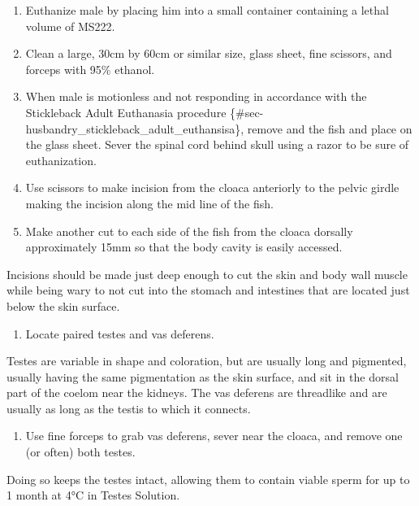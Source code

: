 \documentclass[
  letterpaper,
  DIV=11,
  numbers=noendperiod]{scrreprt}
\providecommand{\tightlist}{%
  \setlength{\itemsep}{0pt}\setlength{\parskip}{0pt}}\usepackage{longtable,booktabs,array}
\begin{document}
\begin{enumerate}
\def\labelenumi{\arabic{enumi}.}
\setcounter{enumi}{4}
\tightlist
\item
  Euthanize male by placing him into a small container containing a
  lethal volume of MS222.
\item
  Clean a large, 30cm by 60cm or similar size, glass sheet, fine
  scissors, and forceps with 95\% ethanol.
\item
  When male is motionless and not responding in accordance with the
  Stickleback Adult Euthanasia procedure
  \{\#sec-husbandry\_stickleback\_adult\_euthansisa\}, remove and the
  fish and place on the glass sheet. Sever the spinal cord behind skull
  using a razor to be sure of euthanization.
\item
  Use scissors to make incision from the cloaca anteriorly to the pelvic
  girdle making the incision along the mid line of the fish.
\item
  Make another cut to each side of the fish from the cloaca dorsally
  approximately 15mm so that the body cavity is easily accessed.
\end{enumerate}

Incisions should be made just deep enough to cut the skin and body wall
muscle while being wary to not cut into the stomach and intestines that
are located just below the skin surface.

\begin{enumerate}
\def\labelenumi{\arabic{enumi}.}
\setcounter{enumi}{9}
\tightlist
\item
  Locate paired testes and vas deferens.
\end{enumerate}

Testes are variable in shape and coloration, but are usually long and
pigmented, usually having the same pigmentation as the skin surface, and
sit in the dorsal part of the coelom near the kidneys. The vas deferens
are threadlike and are usually as long as the testis to which it
connects.

\begin{enumerate}
\def\labelenumi{\arabic{enumi}.}
\setcounter{enumi}{10}
\tightlist
\item
  Use fine forceps to grab vas deferens, sever near the cloaca, and
  remove one (or often) both testes.
\end{enumerate}

Doing so keeps the testes intact, allowing them to contain viable sperm
for up to 1 month at 4°C in Testes Solution.
\end{document}
